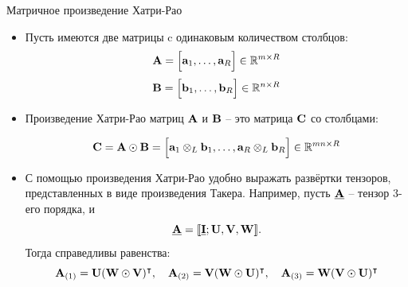 \begin{frame}{Матричное произведение Хатри-Рао}


\begin{itemize}

    \item Пусть имеются две матрицы c одинаковым количеством столбцов:
    $$ \textbf{A} = \Big[ \textbf{a}_1, \dots, \textbf{a}_R \Big] \in \mathbb{R}^{m \times R}$$
    $$ \textbf{B} = \Big[ \textbf{b}_1, \dots, \textbf{b}_R \Big] \in \mathbb{R}^{n \times R}$$
    \item Произведение Хатри-Рао матриц $\textbf{A}$ и $\textbf{B}$ -- это матрица $\textbf{C}$ со столбцами:

    $$ \textbf{C} = \textbf{A} \odot \textbf{B} = \Big[ \textbf{a}_1 \otimes_L \textbf{b}_1, \dots,  \textbf{a}_R \otimes_L \textbf{b}_R \Big] \in \mathbb{R}^{mn \times R}$$
    \item С помощью произведения Хатри-Рао удобно выражать развёртки тензоров, представленных в виде произведения Такера. Например, пусть $\underline{\textbf{A}}$ -- тензор 3-его порядка, и 
    $$ \underline{\textbf{A}} = \llbracket \underline{\textbf{I}} ; \textbf{U}, \textbf{V},  \textbf{W} \rrbracket.$$
    Тогда справедливы равенства:
    $$ \textbf{A}_{(1)} = \textbf{U} (\textbf{W} \odot \textbf{V})^\intercal, \quad \textbf{A}_{(2)} = \textbf{V} (\textbf{W} \odot \textbf{U})^\intercal, \quad \textbf{A}_{(3)} = \textbf{W} (\textbf{V} \odot \textbf{U})^\intercal $$
\end{itemize}

\end{frame}
